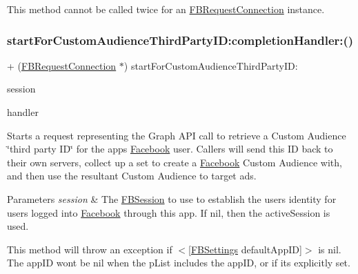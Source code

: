 This method cannot be called twice for an {\ttfamily \hyperlink{interfaceFBRequestConnection}{F\+B\+Request\+Connection}} instance. \mbox{\label{interfaceFBRequestConnection_ab2ed1b7d417b4c723b37512870a5add9}} 
\subsubsection{\texorpdfstring{start\+For\+Custom\+Audience\+Third\+Party\+I\+D\+:completion\+Handler\+:()}{startForCustomAudienceThirdPartyID:completionHandler:()}\hspace{0.1cm}{\footnotesize\ttfamily [1/5]}}
{\footnotesize\ttfamily + (\hyperlink{interfaceFBRequestConnection}{F\+B\+Request\+Connection} $\ast$) start\+For\+Custom\+Audience\+Third\+Party\+I\+D\+: \begin{DoxyParamCaption}\item[{(\hyperlink{interfaceFBSession}{F\+B\+Session} $\ast$)}]{session }\item[{completionHandler:(F\+B\+Request\+Handler)}]{handler }\end{DoxyParamCaption}}

Starts a request representing the Graph A\+PI call to retrieve a Custom Audience \char`\"{}third party I\+D\char`\"{} for the app\textquotesingle{}s \hyperlink{interfaceFacebook}{Facebook} user. Callers will send this ID back to their own servers, collect up a set to create a \hyperlink{interfaceFacebook}{Facebook} Custom Audience with, and then use the resultant Custom Audience to target ads.


\begin{DoxyParams}{Parameters}
{\em session} & The \hyperlink{interfaceFBSession}{F\+B\+Session} to use to establish the user\textquotesingle{}s identity for users logged into \hyperlink{interfaceFacebook}{Facebook} through this app. If {\ttfamily nil}, then the active\+Session is used.\\
\hline
\end{DoxyParams}
This method will throw an exception if $<$\mbox{[}\hyperlink{interfaceFBSettings}{F\+B\+Settings} default\+App\+ID\mbox{]}$>$ is {\ttfamily nil}. The app\+ID won\textquotesingle{}t be nil when the p\+List includes the app\+ID, or if it\textquotesingle{}s explicitly set.

